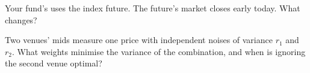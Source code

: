 \begin{interviewq}\label{iq:hf:fair-value:5}
Your fund's  uses the index future. The future's market closes early today. What changes?
\end{interviewq}

\begin{interviewq}\label{iq:hf:fair-value:6}
Two venues' mids measure one price with independent noises of variance $r_1$ and $r_2$. What weights minimise the variance of the combination,
and when is ignoring the second venue optimal?
\end{interviewq}
